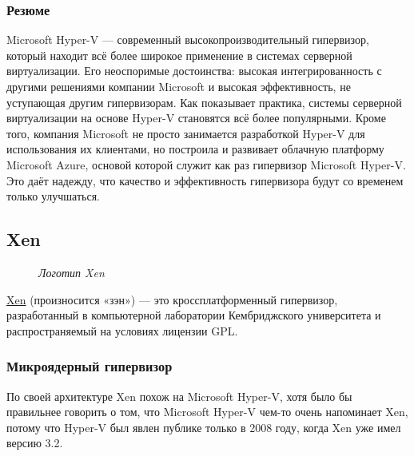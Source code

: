 \documentclass[14pt, a4paper]{article}
\begin{document}
\subsubsection*{Резюме}

Microsoft Hyper-V — современный высокопроизводительный гипервизор, который находит всё более
широкое применение в системах серверной виртуализации. Его неоспоримые достоинства: высокая
интегрированность с другими решениями компании Microsoft и высокая эффективность, не
уступающая другим гипервизорам. Как показывает практика, системы серверной виртуализации на
основе Hyper-V становятся всё более популярными. Кроме того, компания Microsoft не просто
занимается разработкой Hyper-V для использования их клиентами, но построила и развивает
облачную платформу Microsoft Azure, основой которой служит как раз гипервизор Microsoft Hyper-V.
Это даёт надежду, что качество и эффективность гипервизора будут со временем только улучшаться.\newpage

\subsection*{Xen}

\begin{figure}[h]%
    \centering
    \caption*{\textit{Логотип Xen}}
    \label{2.0} %
\end{figure}

\href{https://ru.wikipedia.org/wiki/Xen}{Xen} (произносится «зэн») — это кроссплатформенный гипервизор, разработанный в компьютерной
лаборатории Кембриджского университета и распространяемый на условиях лицензии GPL.


\subsubsection*{Микроядерный гипервизор}


По своей архитектуре Xen похож на Microsoft Hyper-V, хотя было бы правильнее говорить о том, что
Microsoft Hyper-V чем-то очень напоминает Xen, потому что Hyper-V был явлен публике только в 2008
году, когда Xen уже имел версию 3.2.
\end{document}
